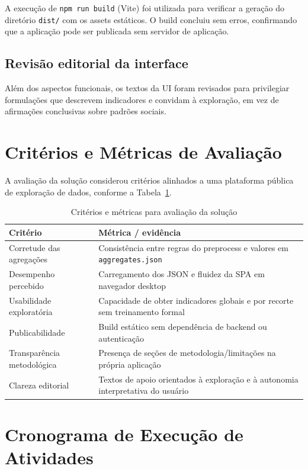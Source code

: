 A execução de \texttt{npm run build} (Vite) foi utilizada para verificar a geração do diretório \texttt{dist/} com os assets estáticos. O build concluiu sem erros, confirmando que a aplicação pode ser publicada sem servidor de aplicação.

\subsection{Revisão editorial da interface}

Além dos aspectos funcionais, os textos da \acs{UI} foram revisados para privilegiar formulações que descrevem indicadores e convidam à exploração, em vez de afirmações conclusivas sobre padrões sociais.

\section{Critérios e Métricas de Avaliação}

A avaliação da solução considerou critérios alinhados a uma plataforma pública de exploração de dados, conforme a Tabela~\ref{tab:metricas}.

\begin{table}[H]
\centering
\caption{Critérios e métricas para avaliação da solução}
\label{tab:metricas}
\begin{tabularx}{\textwidth}{|l|X|}
\hline
Critério & Métrica / evidência \\
\hline
Corretude das agregações & Consistência entre regras do preprocess e valores em \texttt{aggregates.json} \\
\hline
Desempenho percebido & Carregamento dos \acs{JSON} e fluidez da \acs{SPA} em navegador desktop \\
\hline
Usabilidade exploratória & Capacidade de obter indicadores globais e por recorte sem treinamento formal \\
\hline
Publicabilidade & Build estático sem dependência de backend ou autenticação \\
\hline
Transparência metodológica & Presença de seções de metodologia/limitações na própria aplicação \\
\hline
Clareza editorial & Textos de apoio orientados à exploração e à autonomia interpretativa do usuário \\
\hline
\end{tabularx}
\end{table}

\section{Cronograma de Execução de Atividades}

